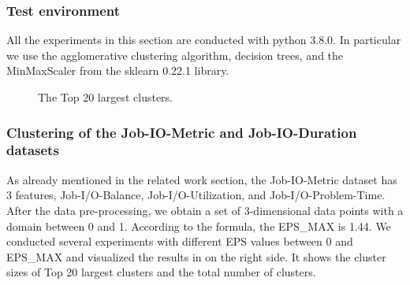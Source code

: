 \documentclass[]{llncs}
\begin{document}
\subsubsection{Test environment}
All the experiments in this section are conducted with python 3.8.0.
In particular we use the agglomerative clustering algorithm, decision trees, and the MinMaxScaler from the sklearn 0.22.1 library.

\begin{figure}
  \caption{The Top 20 largest clusters.}
  \label{fig:datasets_clustering_results}
\end{figure}

\subsubsection{Clustering of the Job-IO-Metric and Job-IO-Duration datasets}
As already mentioned in the related work section, the Job-IO-Metric dataset has 3 features, Job-I/O-Balance, Job-I/O-Utilization, and Job-I/O-Problem-Time.
After the data pre-processing, we obtain a set of 3-dimensional data points with a domain between 0 and 1.
According to the formula, the EPS\_MAX is 1.44.
We conducted several experiments with different EPS values between 0 and EPS\_MAX and visualized the results in  on the right side.
It shows the cluster sizes of Top 20 largest clusters and the total number of clusters.
\end{document}
